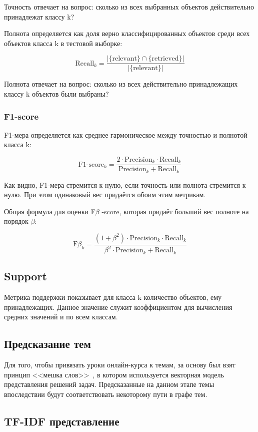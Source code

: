\documentclass[14pt]{matmex-diploma-custom}
\begin{document}
Точность отвечает на вопрос: сколько из всех выбранных объектов действительно принадлежат классу k?

Полнота определяется как доля верно классифицированных объектов среди всех объектов класса k в тестовой выборке:

\[
\text{Recall}_{k}=\frac{|\{\text{relevant}\}\cap\{\text{retrieved}\}|}{|\{\text{relevant}\}|}
\]

Полнота отвечает на вопрос: сколько из всех действительно принадлежащих классу k объектов были выбраны?

\subsubsection*{F1-score}

F1-мера определяется как среднее гармоническое между точностью и полнотой класса k:

\[
\text{F1-score}_{k}=\frac{2\cdot\text{Precision}_{k}\cdot\text{Recall}_{k}}{\text{Precision}_{k} + \text{Recall}_{k}}
\]

Как видно, F1-мера стремится к нулю, если точность или полнота стремится к нулю. При этом одинаковый вес придаётся обоим этим метрикам.

Общая формула для оценки F$\beta$ -score, которая придаёт больший вес полноте на порядок $\beta$:

\[
\text{F$\beta$}_{k}=\frac{(1+\beta^2)\cdot\text{Precision}_{k}\cdot\text{Recall}_{k}}{\beta^2\cdot\text{Precision}_{k} + \text{Recall}_{k}}
\]

\subsection*{Support}

Метрика поддержки показывает для класса k количество объектов, ему принадлежащих. Данное значение служит коэффициентом для вычисления средних значений  и  по всем классам.

\subsection{Предсказание тем} 
Для того, чтобы привязать уроки онлайн-курса к темам, за основу был взят принцип <<мешка слов>>~\cite{mloreilly}, в котором используется векторная модель представления решений задач. Предсказанные на данном этапе темы впоследствии будут соответствовать некоторому пути в графе тем.

\subsection*{TF-IDF представление}
\end{document}
